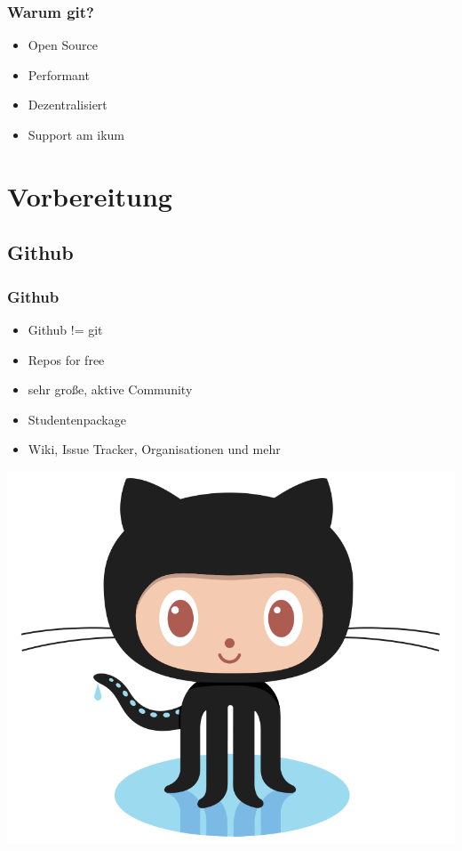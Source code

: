 \documentclass{beamer}
\begin{document}
\begin{frame}
\frametitle{Warum git?}
\begin{itemize}
\item Open Source
\item Performant
\item Dezentralisiert
\item Support am ikum
\end{itemize}
\end{frame}

\section{Vorbereitung}
\subsection{Github}
\begin{frame}
\frametitle{Github}
\begin{minipage}{0.45\textwidth}
\begin{itemize}
\item Github != git
\pause
\item Repos for free
\item sehr gro{\ss}e, aktive Community
\item Studentenpackage
\item Wiki, Issue Tracker, Organisationen und mehr
\end{itemize}
\end{minipage}
\begin{minipage}{0.45\textwidth}
\hfill \includegraphics[scale=0.1]{Octocat.png}
\end{minipage}
\end{frame}
\end{document}
